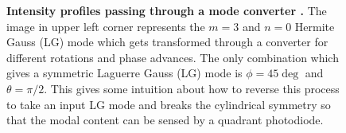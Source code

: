 \begin{figure}[h]
	\centering
	\caption[Intensity profiles passing through a mode converter. ]
	{\textbf{Intensity profiles passing through a mode converter \cite{ONeilModeTransform}.} 
		The image in upper left corner represents the $m=3$ and $n=0$ Hermite Gauss (LG) mode which gets transformed through a converter for different rotations and phase advances.  The only combination which gives a symmetric Laguerre Gauss (LG) mode is $\phi=45\deg$ and $\theta=\pi/2$.  This gives some intuition about how to reverse this process to take an input LG mode and breaks the cylindrical symmetry so that the modal content can be sensed by a quadrant photodiode.
	}
	\label{fig:Oneil_modeconv}
\end{figure}

